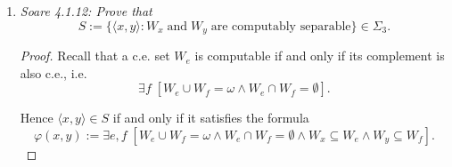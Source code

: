 \documentclass{article}
\begin{document}
\begin{enumerate}[label={\bf Q\arabic*:}]
\begin{proof}
      Hence, we have an effective enumeration of all the $n$-c.e. sets
      $\{Z_e^n\}_{e\in\omega}$, and also an effective enumeration of their
      corresponding computable sequences $\{A_{e,s}^n\}_{e\in\omega}$ that
      witness their $n$-c.e.-ness. Following the hint, we apply a
      diagonalization argument to construct a $(n+1)$-c.e. set which is
      not $n$-c.e. Using the enumeration $\{A_{e,s}^n\}_{e\in\omega}$, we
      construct a recursive sequence $D_s(x)$ that witness the
      $(n+1)$-c.e.-ness of a set $B$, such that $D(e)\neq Z^n_e(e)$ for each
      $e\in\omega$:
      \begin{align*}
        D_s(e) :=
        \begin{cases}
          0 &\text{if}\; s=0,\\
          0 &\text{if}\; s>0\; \text{and}\; A_{e,s}(e)=1,\\
          1 &\text{if}\; s>0\; \text{and}\; A_{e,s}(e)=0.\\
        \end{cases}
      \end{align*}

      Then $D=\lim_sD_s$ is $(n+1)$-c.e. because each $Z_e^n$ is $n$-c.e.
      Also, from construction, $D(e)\neq Z_e^n(e)$ for any $e\in\omega$. \\

      The assertion that d.c.e. sets are not closed under union follows
      directly from the characterization of $n$-c.e. sets, which we have
      shown in (\ref{q:ce}). In particular, the 4-c.e. sets are exactly the
      unions of d.c.e. sets, but the first part of this question has shown
      that the 4-c.e. sets are a strict superset of the d.c.e. sets.
    \end{proof}

  \item \it Soare 4.1.12: Prove that
    \[S:= \{\langle x,y\rangle: W_x\; \text{and}\; W_y\; \text{are
    computably separable}\} \in \Sigma_3.\]

    \begin{proof}
      Recall that a c.e. set $W_e$ is computable if and only if its
      complement is also c.e., i.e.
      \[\exists f\; \left[W_{e}\cup W_{f}=\omega \wedge
      W_{e}\cap W_{f}=\emptyset\right].\]

      Hence $\langle x,y\rangle\in S$ if and only if it satisfies the
      formula
      \[\varphi(x,y):= \exists e,f\; \left[W_{e}\cup W_{f}=\omega \wedge
      W_{e}\cap W_{f}=\emptyset \wedge W_x\subseteq W_e \wedge
      W_y\subseteq W_f\right].\]


\end{proof}
\end{enumerate}
\end{document}
